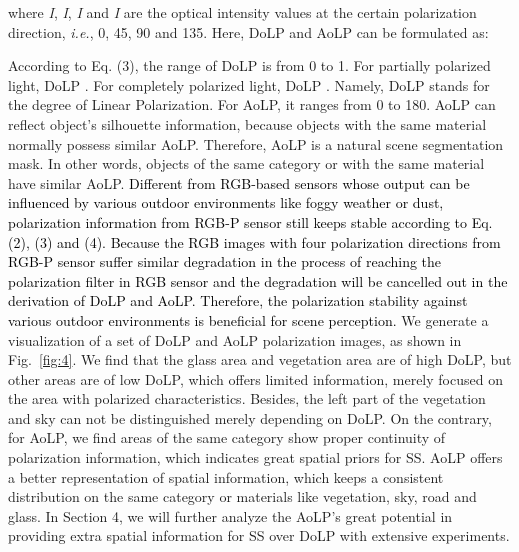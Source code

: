 \documentclass{osa-article}
\newcommand{\CHANGE}[1]{\textcolor{black}{#1}}
\begin{document}
where \textit{I}, \textit{I}, \textit{I} and \textit{I} are the optical intensity values at the certain polarization direction, \textit{i.e.}, 0, 45, 90 and 135.
Here, DoLP and AoLP can be formulated as:


According to Eq. (3), the range of DoLP is from 0 to 1.
For partially polarized light, DoLP .
For completely polarized light, DoLP .
Namely, DoLP stands for the degree of Linear Polarization.
For AoLP, it ranges from 0 to 180. 
AoLP can reflect object's silhouette information, because objects with the same material normally possess similar AoLP.
Therefore, AoLP is a natural scene segmentation mask.
In other words, objects of the same category or with the same material have similar AoLP.
\CHANGE{Different from RGB-based sensors whose output can be influenced by various outdoor environments like foggy weather or dust, polarization information from RGB-P sensor still keeps stable according to Eq. (2), (3) and (4). Because the RGB images with four polarization directions from RGB-P sensor suffer similar degradation in the process of reaching the polarization filter in RGB sensor and the degradation will be cancelled out in the derivation of DoLP and AoLP. Therefore, the polarization stability against various outdoor environments is beneficial for scene perception.}
We generate a visualization of a set of DoLP and AoLP polarization images, as shown in Fig.~\ref{fig:4}.
We find that the glass area and vegetation area are of high DoLP,
but other areas are of low DoLP,
which offers limited information, merely focused on the area with polarized characteristics. 
Besides, the left part of the vegetation and sky can not be distinguished merely depending on DoLP. 
On the contrary, for AoLP, we find areas of the same category show proper continuity of polarization information, which indicates great spatial priors for SS.
AoLP offers a better representation of spatial information, which keeps a consistent distribution on the same category or materials like vegetation, sky, road and glass.
In Section 4, we will further analyze the AoLP's great potential in providing extra spatial information for SS over DoLP with extensive experiments.
\end{document}

